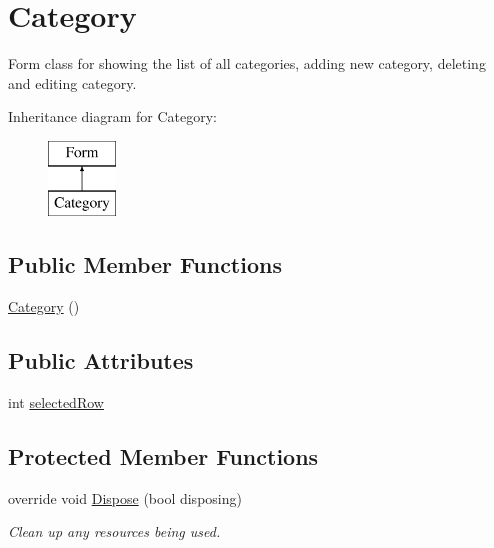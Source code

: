 \hypertarget{classWildlifeTrackingApp_1_1Category}{}\section{Category}
\label{classWildlifeTrackingApp_1_1Category}


Form class for showing the list of all categories, adding new category, deleting and editing category.  


Inheritance diagram for Category\+:\begin{figure}[H]
\begin{center}
\leavevmode
\includegraphics[height=2.000000cm]{classWildlifeTrackingApp_1_1Category}
\end{center}
\end{figure}
\subsection*{Public Member Functions}
\begin{DoxyCompactItemize}
\item 
\hyperlink{classWildlifeTrackingApp_1_1Category_a0e526c1d022adf4f003029e995a50ff7}{Category} ()
\end{DoxyCompactItemize}
\subsection*{Public Attributes}
\begin{DoxyCompactItemize}
\item 
int \hyperlink{classWildlifeTrackingApp_1_1Category_aad96a74a8e07bceb571a64a3355b779d}{selected\+Row}
\end{DoxyCompactItemize}
\subsection*{Protected Member Functions}
\begin{DoxyCompactItemize}
\item 
override void \hyperlink{classWildlifeTrackingApp_1_1Category_a849c3c7f8d08104f0cdb46bee9fe6389}{Dispose} (bool disposing)
\begin{DoxyCompactList}\small\item\em Clean up any resources being used. \end{DoxyCompactList}\end{DoxyCompactItemize}
